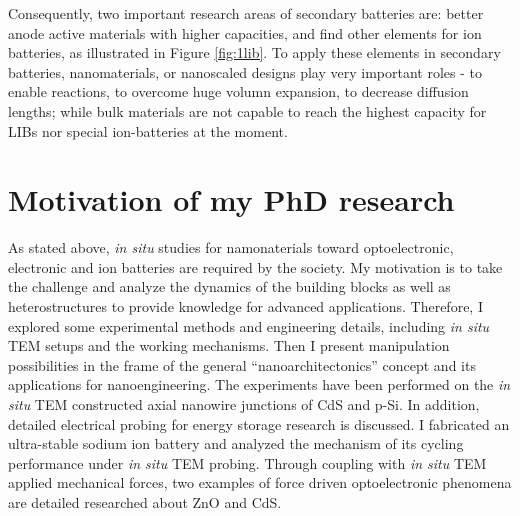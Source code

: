 Consequently, two important research areas of secondary batteries are: better anode active materials with higher capacities, and find other elements for ion batteries, as illustrated in Figure \ref{fig:1lib}. To apply these elements in secondary batteries, nanomaterials, or nanoscaled designs play very important roles - to enable reactions, to overcome huge volumn expansion, to decrease diffusion lengths; while bulk materials are not capable to reach the highest capacity for LIBs nor special ion-batteries at the moment. 

\section{Motivation of my PhD research}
As stated above, {\em in situ} studies for namonaterials toward optoelectronic, electronic and ion batteries are required by the society. My motivation is to take the challenge and analyze the dynamics of the building blocks as well as heterostructures to provide knowledge for advanced applications. 
Therefore, I explored some experimental methods and engineering details, including {\em in situ} TEM setups and the working mechanisms. Then I present manipulation possibilities in the frame of the general “nanoarchitectonics” concept and its applications for nanoengineering. The experiments have been performed on the {\em in situ} TEM constructed axial nanowire junctions of CdS and p-Si. In addition, detailed electrical probing for energy storage research is discussed. I fabricated an ultra-stable sodium ion battery and analyzed the mechanism of its cycling performance under {\em in situ} TEM probing. Through coupling with {\em in situ} TEM applied mechanical forces, two examples of force driven optoelectronic phenomena are detailed researched about ZnO and CdS. 